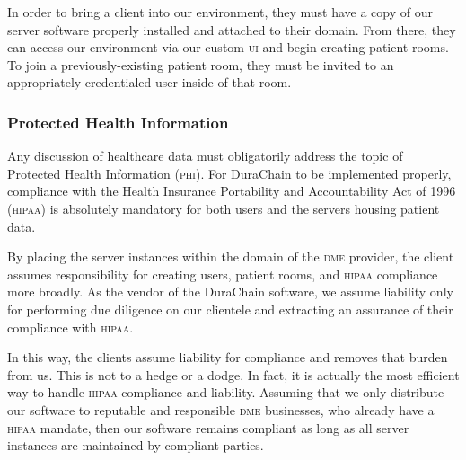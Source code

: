  In order to bring a client into our environment, they must have a copy of our server software properly installed and attached to their domain. From there, they can access our environment via our custom \textsc{ui} and begin creating patient rooms. To join a previously-existing patient room, they must be invited to an appropriately credentialed user inside of that room.%

\subsubsection{Protected Health Information}
Any discussion of healthcare data must obligatorily address the topic of Protected Health Information (\textsc{phi}). For DuraChain to be implemented properly, compliance with the Health Insurance Portability and Accountability Act of 1996 (\textsc{hipaa})\cite{HIPAA} is absolutely mandatory for both users and the servers housing patient data.%

By placing the server instances within the domain of the \textsc{dme} provider, the client assumes responsibility for creating users, patient rooms, and \textsc{hipaa} compliance more broadly. As the vendor of the DuraChain software, we assume liability only for performing due diligence on our clientele and extracting an assurance of their compliance with \textsc{hipaa}.%

In this way, the clients assume liability for compliance and removes that burden from us. This is not to a hedge or a dodge. In fact, it is actually the most efficient way to handle \textsc{hipaa} compliance and liability. Assuming that we only distribute our software to reputable and responsible \textsc{dme} businesses, who already have a \textsc{hipaa} mandate, then our software remains compliant as long as all server instances are maintained by compliant parties.%

